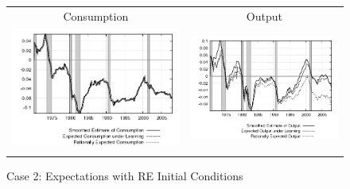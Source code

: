 \begin{figure}
\caption{Case 2: Expectations with RE Initial Conditions}\label{fg2:exp_reallinit}\vspace*{1pc}
\hspace*{-0.7in}\begin{tabular}{cc}
Consumption & Output \\
\includegraphics[scale=0.52]{results_reallinit/consumption_exp.png} & 
\includegraphics[scale=0.52]{results_reallinit/output_exp.png} \\ \\ 
 

\end{tabular}
\end{figure}
